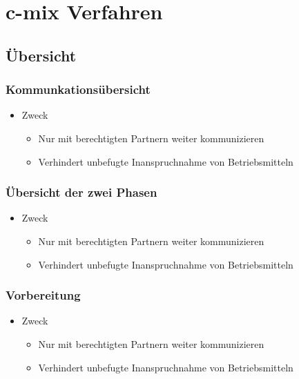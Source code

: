\documentclass[t, xcolor=dvipsnames]{beamer}
\begin{document}
\section{c-mix Verfahren} %
\subsection{Übersicht} %
\begin{frame}
	\frametitle{Kommunkationsübersicht}
	\begin{itemize}
		\item Zweck
			\begin{itemize}
				\item Nur mit \alert{berechtigten Partnern} weiter kommunizieren
				\item Verhindert unbefugte Inanspruchnahme von Betriebsmitteln
			\end{itemize}
	\end{itemize}
	\vspace{\fill}
\end{frame}

\begin{frame}
	\frametitle{Übersicht der zwei Phasen}
	\begin{itemize}
		\item Zweck
			\begin{itemize}
				\item Nur mit \alert{berechtigten Partnern} weiter kommunizieren
				\item Verhindert unbefugte Inanspruchnahme von Betriebsmitteln
			\end{itemize}
	\end{itemize}
	\vspace{\fill}
\end{frame}

\begin{frame}
	\frametitle{Vorbereitung}
	\begin{itemize}
		\item Zweck
			\begin{itemize}
				\item Nur mit \alert{berechtigten Partnern} weiter kommunizieren
				\item Verhindert unbefugte Inanspruchnahme von Betriebsmitteln
			\end{itemize}
	\end{itemize}
	\vspace{\fill}
\end{frame}
\end{document}
